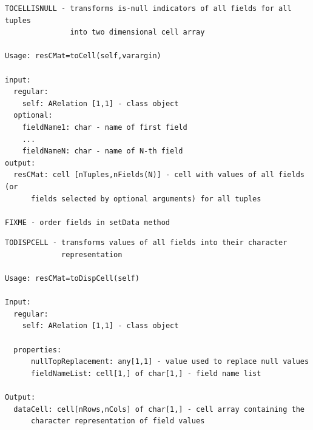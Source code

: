 \documentclass[letterpaper,10pt,english]{sphinxmanual}
\begin{document}
\label{chap_func:smartdb-relations-atypifiedstaticrelation-tocellisnull}
\begin{Verbatim}[commandchars=\\\{\}]
TOCELLISNULL - transforms is-null indicators of all fields for all tuples
               into two dimensional cell array

Usage: resCMat=toCell(self,varargin)

input:
  regular:
    self: ARelation [1,1] - class object
  optional:
    fieldName1: char - name of first field
    ...
    fieldNameN: char - name of N-th field
output:
  resCMat: cell [nTuples,nFields(N)] - cell with values of all fields (or
      fields selected by optional arguments) for all tuples

FIXME - order fields in setData method
\end{Verbatim}
\label{chap_func:smartdb-relations-atypifiedstaticrelation-todispcell}
\begin{Verbatim}[commandchars=\\\{\}]
TODISPCELL - transforms values of all fields into their character
             representation

Usage: resCMat=toDispCell(self)

Input:
  regular:
    self: ARelation [1,1] - class object

  properties:
      nullTopReplacement: any[1,1] - value used to replace null values
      fieldNameList: cell[1,] of char[1,] - field name list

Output:
  dataCell: cell[nRows,nCols] of char[1,] - cell array containing the
      character representation of field values
\end{Verbatim}
\label{chap_func:smartdb-relations-atypifiedstaticrelation-tomat}
\end{document}
